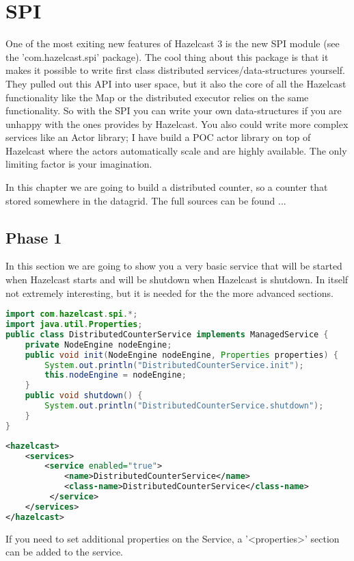 \chapter{SPI}

One of the most exiting new features of Hazelcast 3 is the new SPI module (see the 'com.hazelcast.spi' package). The cool thing about this package is that it makes it possible to write first class distributed services/data-structures yourself. They pulled out this API into user space, but it also the core of all the Hazelcast functionality like the Map or the distributed executor relies on the same functionality. So with the SPI you can write your own data-structures if you are unhappy with the ones provides by Hazelcast. You also could write more complex services like an Actor library; I have build a POC actor library on top of Hazelcast where the actors automatically scale and are highly available. The only limiting factor is your imagination.

In this chapter we are going to build a distributed counter, so a counter that stored somewhere in the datagrid. The full sources can be found ...

\section{Phase 1}
In this section we are going to show you a very basic service that will be started when Hazelcast starts and will be shutdown when Hazelcast is shutdown. In itself not extremely interesting, but it is needed for the the more advanced sections.

\begin{lstlisting}[language=java]
import com.hazelcast.spi.*;
import java.util.Properties;
public class DistributedCounterService implements ManagedService {
    private NodeEngine nodeEngine;
    public void init(NodeEngine nodeEngine, Properties properties) {
        System.out.println("DistributedCounterService.init");
        this.nodeEngine = nodeEngine;
    }
    public void shutdown() {
        System.out.println("DistributedCounterService.shutdown");
    }
}
\end{lstlisting}

\begin{lstlisting}[language=xml]
<hazelcast>
    <services>
        <service enabled="true">
            <name>DistributedCounterService</name>
            <class-name>DistributedCounterService</class-name>
         </service>
    </services>
</hazelcast>
\end{lstlisting}
If you need to set additional properties on the Service, a '<properties>' section can be added to the service.


